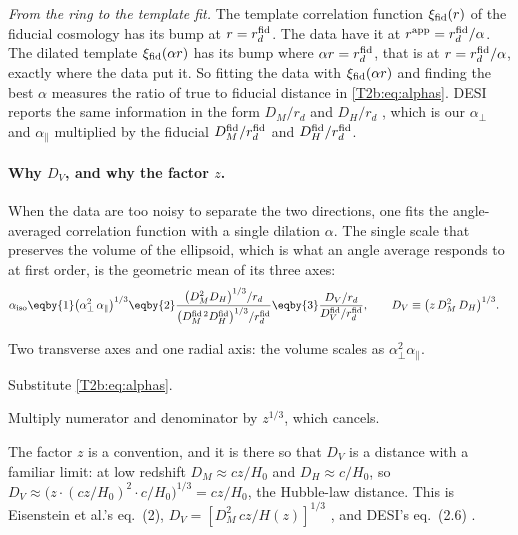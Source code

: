 \emph{From the ring to the template fit.} The template correlation function $\xi_{\rm fid}(r)$ of the fiducial cosmology has its bump at $r=r_d^{\rm fid}$. The data have it at $r^{\rm app}=r_d^{\rm fid}/\alpha$. The dilated template $\xi_{\rm fid}(\alpha r)$ has its bump where $\alpha r=r_d^{\rm fid}$, that is at $r=r_d^{\rm fid}/\alpha$, exactly where the data put it. So fitting the data with $\xi_{\rm fid}(\alpha r)$ and finding the best $\alpha$ measures the ratio of true to fiducial distance in \eqref{T2b:eq:alphas}. DESI reports the same information in the form $D_M/r_d$ and $D_H/r_d$ \cite[Sec.~2.1]{DESI2024VI}, which is our $\alpha_\perp$ and $\alpha_\parallel$ multiplied by the fiducial $D_M^{\rm fid}/r_d^{\rm fid}$ and $D_H^{\rm fid}/r_d^{\rm fid}$.

\paragraph{Why $D_V$, and why the factor $z$.} When the data are too noisy to separate the two directions, one fits the angle-averaged correlation function with a single dilation $\alpha$. The single scale that preserves the volume of the ellipsoid, which is what an angle average responds to at first order, is the geometric mean of its three axes:
\begin{align}
  \alpha_{\rm iso}
  &\eqby{1}\big(\alpha_\perp^2\,\alpha_\parallel\big)^{1/3}
  \eqby{2}\frac{\big(D_M^2D_H\big)^{1/3}/r_d}{\big(D_M^{{\rm fid}\,2}D_H^{\rm fid}\big)^{1/3}/r_d^{\rm fid}}
  \eqby{3}\frac{D_V/r_d}{D_V^{\rm fid}/r_d^{\rm fid}},\qquad
  D_V\equiv\big(z\,D_M^2\,D_H\big)^{1/3}.
  \label{T2b:eq:dv}
\end{align}
\begin{explain}
  \item Two transverse axes and one radial axis: the volume scales as $\alpha_\perp^2\alpha_\parallel$.
  \item Substitute \eqref{T2b:eq:alphas}.
  \item Multiply numerator and denominator by $z^{1/3}$, which cancels.
\end{explain}
The factor $z$ is a convention, and it is there so that $D_V$ is a distance with a familiar limit: at low redshift $D_M\approx cz/H_0$ and $D_H\approx c/H_0$, so $D_V\approx\big(z\cdot(cz/H_0)^2\cdot c/H_0\big)^{1/3}=cz/H_0$, the Hubble-law distance. This is Eisenstein et al.'s eq.~(2), $D_V=[D_M^2\,cz/H(z)]^{1/3}$ \cite[Sec.~4]{Eisenstein2005}, and DESI's eq.~(2.6) \cite{DESI2024VI}.

